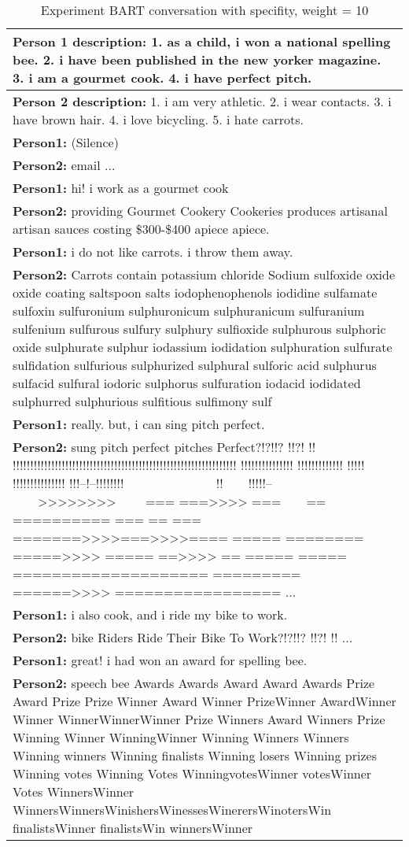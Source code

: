 \begin{table}[H]
\centering
 \begin{tabular}{|p{14cm}|} 
 \hline
 \textbf{Person 1 description:} 1. as a child, i won a national spelling bee. 2. i have been published in the new yorker magazine. 3. i am a gourmet cook. 4. i have perfect pitch. \\
 \hline
 \textbf{Person 2 description:} 1. i am very athletic. 2. i wear contacts. 3. i have brown hair. 4. i love bicycling. 5. i hate carrots. \\
 \hline
 \textbf{Person1:} (Silence) \\
 \textbf{Person2:} email ...\\ 
 \textbf{Person1:} hi! i work as a gourmet cook \\
 \textbf{Person2:} providing Gourmet Cookery Cookeries produces artisanal artisan sauces costing \$300-\$400 apiece apiece.\\
 \textbf{Person1:} i do not like carrots. i throw them away. \\
 \textbf{Person2:} Carrots contain potassium chloride Sodium sulfoxide oxide oxide coating saltspoon salts iodophenophenols iodidine sulfamate sulfoxin sulfuronium sulphuronicum sulphuranicum sulfuranium sulfenium sulfurous sulfury sulphury sulfioxide sulphurous sulphoric oxide sulphurate sulphur iodassium iodidation sulphuration sulfurate sulfidation sulfurious sulphurized sulphural sulforic acid sulphurus sulfacid sulfural iodoric sulphorus sulfuration iodacid iodidated sulphurred sulphurious sulfitious sulfimony sulf \\
 \textbf{Person1:} really. but, i can sing pitch perfect. \\
 \textbf{Person2:} sung pitch perfect pitches Perfect?!?!!? !!?! !! !!!!!!!!!!!!!!!!!!!!!!!!!!!!!!!!!!!!!!!!!!!!!!!!!!!!!!!!!!!!!!!! !!!!!!!!!!!!!!! !!!!!!!!!!!!! !!!!! !!!!!!!!!!!!!!! !!!--!--!!!!!!!!~~~~~~~~~~~~~~ !!~~~~!!!!!--~~~~>>>>>>>>~~~~ === ===>>>> ===~~~~== ========== === == === =======>>>>===>>>>==== ===== ======== =====>>>> ===== ==>>>> == ===== ===== ==================== ========= ======>>>> ================= ...\\
 \textbf{Person1:} i also cook, and i ride my bike to work. \\
 \textbf{Person2:} bike Riders Ride Their Bike To Work?!?!!? !!?! !! ... \\
 \textbf{Person1:} great! i had won an award for spelling bee. \\
 \textbf{Person2:} speech bee Awards Awards Award Award Awards Prize Award Prize Prize Winner Award Winner PrizeWinner AwardWinner Winner WinnerWinnerWinner Prize Winners Award Winners Prize Winning Winner WinningWinner Winning Winners Winners Winning winners Winning finalists Winning losers Winning prizes Winning votes Winning Votes WinningvotesWinner votesWinner Votes WinnersWinner WinnersWinnersWinishersWinessesWinerersWinotersWin finalistsWinner finalistsWin winnersWinner \\
 \hline
 \end{tabular}
 \caption{Experiment BART conversation with specifity, weight = 10}
\label{tab:bart_conversation_idf10_ap}
\end{table}


